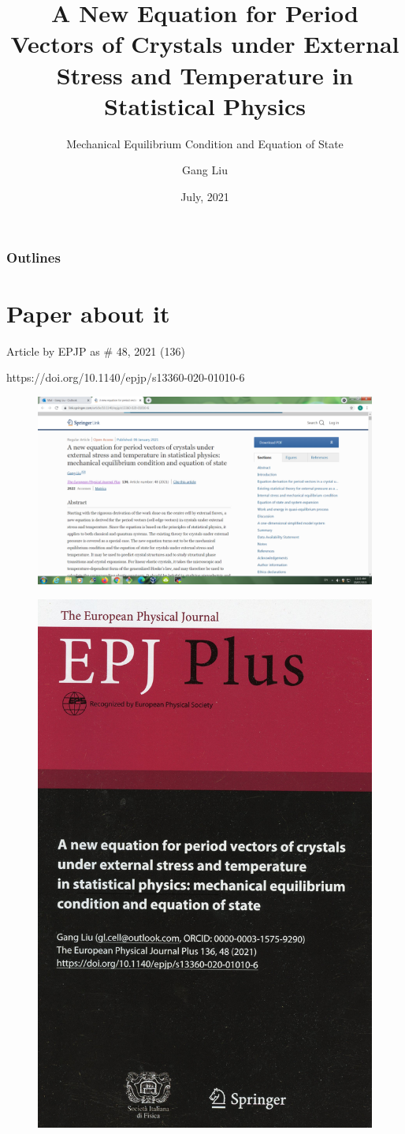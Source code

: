 \documentclass[8pt]{beamer}
\title{A New Equation for Period Vectors of Crystals under External Stress and Temperature in Statistical Physics}
\subtitle{ {\color{yellow} Mechanical Equilibrium Condition and Equation of State}}
\author{Gang Liu}
\institute
{ gl.cell@outlook.com \\
https://github.com/LiuGangKingston \\
http://www.linkedin.com/in/liuganglinkedin \\
https://doi.org/10.1140/epjp/s13360-020-01010-6 \\
Independent Researcher, Kingston, Ontario, Canada
}
\date {July, 2021}
\begin{document}
\frame{\titlepage}

\begin{frame}
\frametitle{Outlines}
\tableofcontents
\end{frame}




\section{Paper about it}

\begin{frame}{Article by EPJP as \# 48, 2021 (136)}

{\centering \vspace{.2cm} {https://doi.org/10.1140/epjp/s13360-020-01010-6} }

\pause 
\begin{figure} 
      \includegraphics[width=1.\textwidth]{./0083.png}
\end{figure} 
       
\pause 
\vspace{-8.15cm} 
\begin{figure} \hspace{9.5cm}
      \includegraphics[width=.31\textwidth]{./img264.jpg}
\end{figure}

\end{frame}
\end{document}
